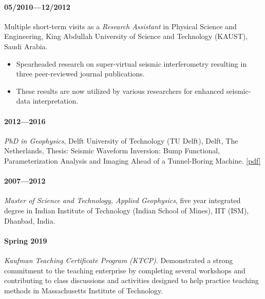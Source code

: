 \documentclass[9pt]{developercv} %
\begin{document}
\paragraph{05/2010---12/2012}\label{section-1}

Multiple
short-term
visits as
a
\emph{Research
Assistant}
in
Physical
Science
and
Engineering,
King
Abdullah
University
of Science
and
Technology
(KAUST),
Saudi
Arabia.

\begin{itemize}
\item
  Spearheaded
  research
  on
  super-virtual
  seismic
  interferometry
  resulting
  in three
  peer-reviewed
  journal
  publications.
\item
  These
  results
  are now
  utilized
  by
  various
  researchers
  for
  enhanced
  seismic-data
  interpretation.
\end{itemize}

\label{education}

\paragraph{2012---2016}\label{section-2}

\emph{PhD
in
Geophysics},
Delft
University
of
Technology
(TU
Delft),
Delft, The
Netherlands,
Thesis:
Seismic
Waveform
Inversion:
Bump
Functional,
Parameterization
Analysis
and
Imaging
Ahead of a
Tunnel-Boring
Machine.
\href{https://repository.tudelft.nl/islandora/object/uuid:8d59fd51-cbac-408d-a3e0-6a15891c2695/datastream/OBJ/download}{{[}pdf{]}}

\paragraph{2007---2012}\label{section-3}

\emph{Master
of Science
and
Technology,
Applied
Geophysics},
five year
integrated
degree in
Indian
Institute
of
Technology
(Indian
School of
Mines),
IIT (ISM),
Dhanbad,
India.

\label{teaching-experience-and-certification}

\paragraph{Spring
2019}\label{spring-2019}

\emph{Kaufman
Teaching
Certificate
Program
(KTCP)}.
Demonstrated
a strong
commitment
to the
teaching
enterprise
by
completing
several
workshops
and
contributing
to class
discussions
and
activities
designed
to help
practice
teaching
methods in
Massachusetts
Institute
of
Technology.
\end{document}
